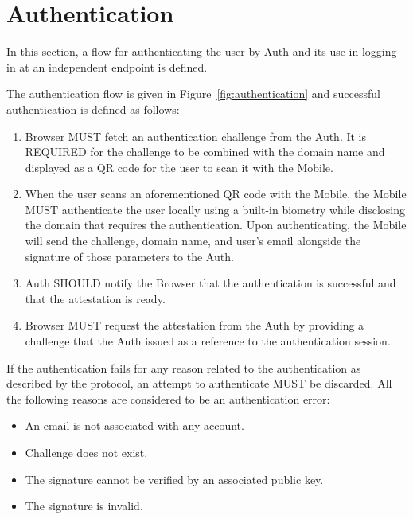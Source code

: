\section{Authentication}
In this section, a flow for authenticating the user by Auth and its use in logging in at an independent endpoint
is defined.
\medskip

The authentication flow is given in Figure~\ref{fig:authentication} and successful authentication is defined as 
follows:
    \begin{enumerate}
        \item Browser MUST fetch an authentication challenge from the Auth. It is REQUIRED for the challenge 
                to be combined with the domain name and displayed as a QR code for the user to scan it with 
                the Mobile.
        \item When the user scans an aforementioned QR code with the Mobile, the Mobile MUST authenticate the 
                user locally using a built-in biometry while disclosing the domain that requires the authentication.
                Upon authenticating, the Mobile will send the challenge, domain name, and user's email alongside the
                signature of those parameters to the Auth.
        \item Auth SHOULD notify the Browser that the authentication is successful and that the attestation is
                ready.
        \item Browser MUST request the attestation from the Auth by providing a challenge that the Auth issued 
                as a reference to the authentication session.
    \end{enumerate}
    
If the authentication fails for any reason related to the authentication as described by the protocol, an attempt to 
authenticate MUST be discarded. All the following reasons are considered to be an authentication error:
    \begin{itemize}
        \item An email is not associated with any account.
        \item Challenge does not exist.
        \item The signature cannot be verified by an associated public key.
        \item The signature is invalid.
    \end{itemize}

